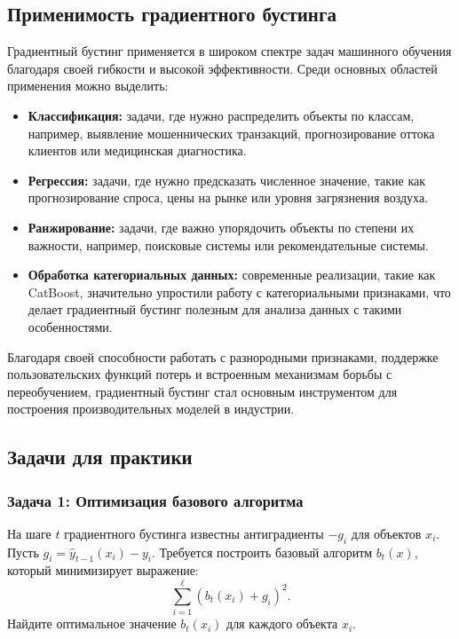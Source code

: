 \subsection{Применимость градиентного бустинга}

Градиентный бустинг применяется в широком спектре задач машинного обучения благодаря своей гибкости и высокой эффективности. Среди основных областей применения можно выделить:

\begin{itemize}
    \item \textbf{Классификация:} задачи, где нужно распределить объекты по классам, например, выявление мошеннических транзакций, прогнозирование оттока клиентов или медицинская диагностика.
    \item \textbf{Регрессия:} задачи, где нужно предсказать численное значение, такие как прогнозирование спроса, цены на рынке или уровня загрязнения воздуха.
    \item \textbf{Ранжирование:} задачи, где важно упорядочить объекты по степени их важности, например, поисковые системы или рекомендательные системы.
    \item \textbf{Обработка категориальных данных:} современные реализации, такие как CatBoost, значительно упростили работу с категориальными признаками, что делает градиентный бустинг полезным для анализа данных с такими особенностями.
\end{itemize}

Благодаря своей способности работать с разнородными признаками, поддержке пользовательских функций потерь и встроенным механизмам борьбы с переобучением, градиентный бустинг стал основным инструментом для построения производительных моделей в индустрии.

\subsection{Задачи для практики}

\subsubsection{Задача 1: Оптимизация базового алгоритма}

На шаге $t$ градиентного бустинга известны антиградиенты $-g_i$ для объектов $x_i$. Пусть $g_i = \hat{y}_{t-1}(x_i) - y_i$.  
Требуется построить базовый алгоритм $b_t(x)$, который минимизирует выражение:
\[
\sum_{i=1}^\ell (b_t(x_i) + g_i)^2.
\]
Найдите оптимальное значение $b_t(x_i)$ для каждого объекта $x_i$.


